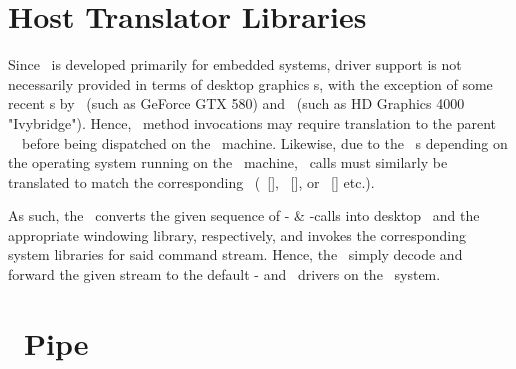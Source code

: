 
\section*{Host Translator Libraries}
\label{sec:appendixa_hostsystemtranslatorlibraries}

Since \termopengles\ is developed primarily for embedded systems, driver support is not necessarily provided in terms of desktop graphics \termgpu s, with the exception of some recent \termgpu s by \termnvidia\ (such as GeForce GTX 580) and \termintel\ (such as HD Graphics 4000 "Ivybridge").
Hence, \termapi\ method invocations may require translation to the parent \termapi\ \termopengl\ before being dispatched on the \termhost\ machine.
Likewise, due to the \termegl\ \termabi s depending on the operating system running on the \termhost\ machine, \termegl\ calls must similarly be translated to match the corresponding \termabi\ (\termxgl\ [\termlinux ], \termagl\ [\termosx ], or \termwgl\ [\termwindows ] etc.).

As such, the \termhosttranslatorlibraries\ converts the given sequence of \termopengles - \& \termegl -calls into desktop \termopengl\ and the appropriate windowing library, respectively, and invokes the corresponding system libraries for said command stream.
Hence, the \termhosttranslatorlibraries\ simply decode and forward the given stream to the default \termopengl - and \termegl\ drivers on the \termhost\ system.

\section*{\termsimics\ Pipe}
\label{sec:appendixa_simicspipe}

